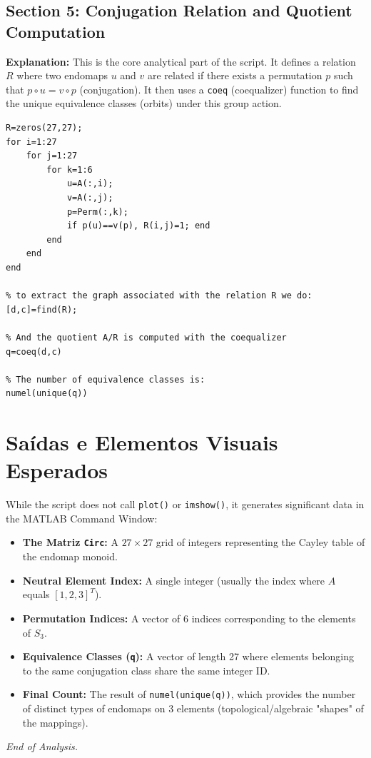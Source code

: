 \subsection{Section 5: Conjugation Relation and Quotient Computation}
\textbf{Explanation:} This is the core analytical part of the script. It defines a relation $R$ where two endomaps $u$ and $v$ are related if there exists a permutation $p$ such that $p \circ u = v \circ p$ (conjugation). It then uses a \texttt{coeq} (coequalizer) function to find the unique equivalence classes (orbits) under this group action.
\begin{lstlisting}
R=zeros(27,27);
for i=1:27
    for j=1:27
        for k=1:6
            u=A(:,i);
            v=A(:,j);
            p=Perm(:,k);
            if p(u)==v(p), R(i,j)=1; end
        end
    end
end

% to extract the graph associated with the relation R we do:
[d,c]=find(R);

% And the quotient A/R is computed with the coequalizer
q=coeq(d,c)

% The number of equivalence classes is:
numel(unique(q))
\end{lstlisting}

\section{Saídas e Elementos Visuais Esperados}
While the script does not call \texttt{plot()} or \texttt{imshow()}, it generates significant data in the MATLAB Command Window:

\begin{itemize}
    \item \textbf{The Matriz \texttt{Circ}:} A $27 \times 27$ grid of integers representing the Cayley table of the endomap monoid.
    \item \textbf{Neutral Element Index:} A single integer (usually the index where $A$ equals $[1, 2, 3]^T$).
    \item \textbf{Permutation Indices:} A vector of 6 indices corresponding to the elements of $S_3$.
    \item \textbf{Equivalence Classes (\texttt{q}):} A vector of length 27 where elements belonging to the same conjugation class share the same integer ID.
    \item \textbf{Final Count:} The result of \texttt{numel(unique(q))}, which provides the number of distinct types of endomaps on 3 elements (topological/algebraic "shapes" of the mappings).
\end{itemize}

\vspace{1cm}
\begin{center}
    \textit{End of Analysis.}
\end{center}

